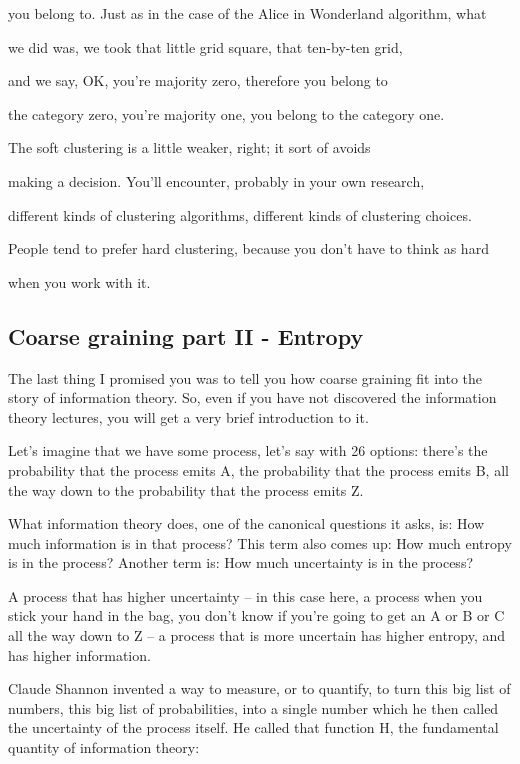 \documentclass[]{article}
\begin{document}
you belong to. Just as in the case of the
Alice in Wonderland algorithm, what

we did was, we took that little
grid square, that ten-by-ten grid,

and we say, OK, you're majority zero,
therefore you belong to

the category zero, you're majority one,
you belong to the category one.

The soft clustering is a little weaker,
right; it sort of avoids

making a decision. You'll encounter,
probably in your own research,

different kinds of clustering algorithms,
different kinds of clustering choices.

People tend to prefer hard clustering,
because you don't have to think as hard

when you work with it.

\subsection{Coarse graining part II - Entropy}

The last thing I promised you
was to tell you how coarse graining
fit into the story of information theory.
So, even if you have not discovered
the information theory lectures,
you will get
a very brief introduction to it.

Let's imagine that we have some process,
let's say with 26 options:
there's the probability
that the process emits A,
the probability that the process emits B,
all the way down to the probability
that the process emits Z.

What information theory does,
one of the canonical questions
it asks, is:
How much information
is in that process?
This term also comes up:
How much entropy is in the process?
Another term is: How much uncertainty is in the process?

A process that has higher uncertainty –
in this case here, a process
when you stick your hand in the bag,
you don't know if you're going
to get an A or B or C
all the way down to Z –
a process that is more uncertain
has higher entropy,
and has higher information.

Claude Shannon invented a way
to measure, or to quantify,
to turn this big list of numbers,
this big list of probabilities,
into a single number which he then called
the uncertainty of the process itself.
He called that function H, the fundamental quantity
of information theory:
\end{document}
